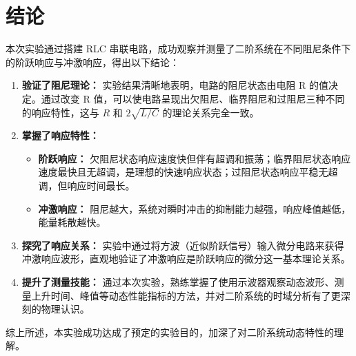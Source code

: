 \documentclass[12pt]{ctexart}
\begin{document}
\section{结论}
本次实验通过搭建 RLC 串联电路，成功观察并测量了二阶系统在不同阻尼条件下的阶跃响应与冲激响应，得出以下结论：

\begin{enumerate}
    \item \textbf{验证了阻尼理论：} 实验结果清晰地表明，电路的阻尼状态由电阻 R 的值决定。通过改变 R 值，可以使电路呈现出欠阻尼、临界阻尼和过阻尼三种不同的响应特性，这与 $R$ 和 $2\sqrt{L/C}$ 的理论关系完全一致。

    \item \textbf{掌握了响应特性：}
    \begin{itemize}
        \item \textbf{阶跃响应：} 欠阻尼状态响应速度快但伴有超调和振荡；临界阻尼状态响应速度最快且无超调，是理想的快速响应状态；过阻尼状态响应平稳无超调，但响应时间最长。
        \item \textbf{冲激响应：} 阻尼越大，系统对瞬时冲击的抑制能力越强，响应峰值越低，能量耗散越快。
    \end{itemize}

    \item \textbf{探究了响应关系：} 实验中通过将方波（近似阶跃信号）输入微分电路来获得冲激响应波形，直观地验证了冲激响应是阶跃响应的微分这一基本理论关系。

    \item \textbf{提升了测量技能：} 通过本次实验，熟练掌握了使用示波器观察动态波形、测量上升时间、峰值等动态性能指标的方法，并对二阶系统的时域分析有了更深刻的物理认识。
\end{enumerate}

综上所述，本实验成功达成了预定的实验目的，加深了对二阶系统动态特性的理解。
\end{document}
